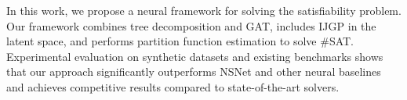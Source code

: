 In this work, we propose a neural framework for solving the satisfiability problem. 
Our framework combines tree decomposition and GAT, includes IJGP in the latent space, 
and performs partition function estimation to solve \#SAT. Experimental evaluation 
on synthetic datasets and existing benchmarks shows that our approach significantly 
outperforms NSNet and other neural baselines and achieves competitive results compared 
to state-of-the-art solvers.
